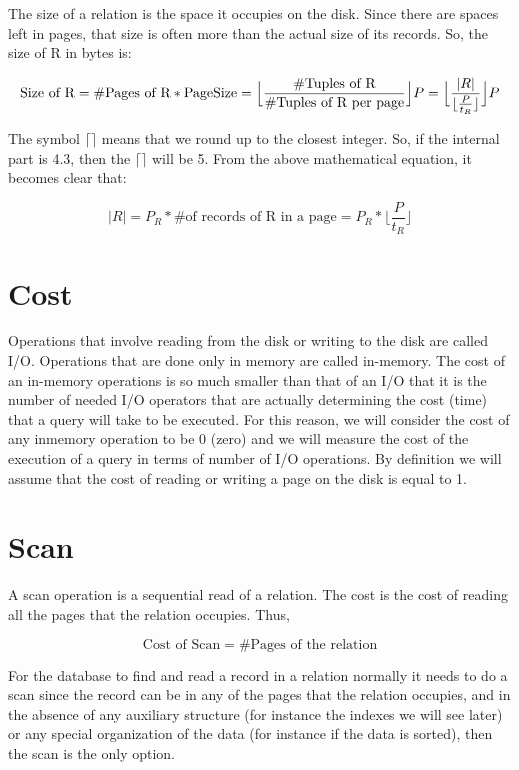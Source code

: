 \documentclass[11pt]{article}
\begin{document}
The size of a relation is the space it occupies on the disk. Since there are spaces left in pages, that size is often more than the actual size of its records. So, the size of R in bytes is:

$$
\text{Size of R} = \text{\#Pages of R} * \text{PageSize} = \Big\lfloor\frac{\text{\#Tuples of R}}{\text{\#Tuples of R per page}}\Big\rfloor P \\
= \Big\lfloor\frac{ |R| }{\lfloor\frac{P}{t_R}\rfloor}\Big\rfloor P
$$

The symbol $\lceil \rceil$	means that we round up to the closest integer. So, if the internal part is 4.3, then the $\lceil \rceil$ will be 5.
From the above mathematical equation, it becomes clear that:

$$
|R| = P_R * \#\text{of records of R in a page} = P_R * \Big\lfloor\frac{P}{t_R}\Big\rfloor
$$

\section{Cost}

Operations that involve reading from the disk or writing to the disk are called I/O. Operations that are done only in memory are called in-memory. The cost of an in-memory operations is so much smaller than that of an I/O that it is the number of needed I/O operators that are actually determining the cost (time) that a query will take to be executed. For this reason, we will consider the cost of any inmemory operation to be 0 (zero) and we will measure the cost of the execution of a query in terms of number of I/O operations. By definition we will assume that the cost of reading or writing a page on the disk is equal to 1.

\section{Scan}

A scan operation is a sequential read of a relation. The cost is the cost of reading all the pages that the relation occupies. Thus,

$$
\text{Cost of Scan} = \#\text{Pages of the relation}
$$

For the database to find and read a record in a relation normally it needs to do a scan since the record can be in any of the pages that the relation occupies, and in the absence of any auxiliary structure (for instance the indexes we will see later) or any special organization of the data (for instance if the data is sorted), then the scan is the only option.
\end{document}

